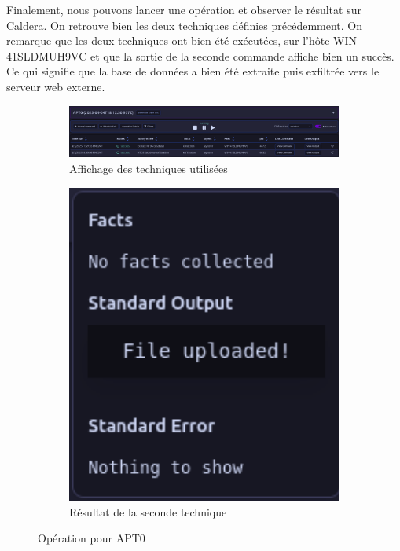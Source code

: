 \documentclass[12pt,letterpaper]{article}
\begin{document}
Finalement, nous pouvons lancer une opération et observer le résultat sur Caldera.
On retrouve bien les deux techniques définies précédemment.
On remarque que les deux techniques ont bien été exécutées, sur l'hôte WIN-41SLDMUH9VC et que la sortie de la seconde commande affiche bien un succès.
Ce qui signifie que la base de données a bien été extraite puis exfiltrée vers le serveur web externe.

\begin{figure}[h!]
    \centering
    \begin{subfigure}{0.95\textwidth}
        \centering
        \includegraphics[width=1\textwidth]{images/caldera/apt0_operation.png}
        \caption{Affichage des techniques utilisées}
        \label{fig:apt0_operation_1}
    \end{subfigure}
    \begin{subfigure}{0.25\textwidth}
        \centering
        \includegraphics[width=1\textwidth]{images/caldera/apt0_operation_result.png}
        \caption{Résultat de la seconde technique}
        \label{fig:apt0_operation_2}
    \end{subfigure}
    \caption{Opération pour APT0}
\end{figure}
\end{document}
